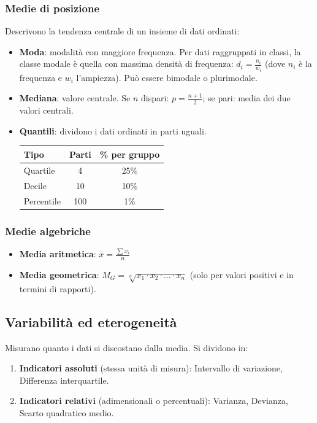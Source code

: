 \documentclass[a4paper,11pt]{article}
\begin{document}
\subsubsection{Medie di posizione}
Descrivono la tendenza centrale di un insieme di dati ordinati:
\begin{itemize}
    \item \textbf{Moda}: modalità con maggiore frequenza. Per dati raggruppati in classi, la classe modale è quella con massima densità di frequenza: $d_i = \frac{n_i}{w_i}$ (dove $n_i$ è la frequenza e $w_i$ l'ampiezza). Può essere bimodale o plurimodale.
    \item \textbf{Mediana}: valore centrale. Se $n$ dispari: $p = \frac{n+1}{2}$; se pari: media dei due valori centrali.
    \item \textbf{Quantili}: dividono i dati ordinati in parti uguali.
    \begin{center}
    \begin{tabular}{lcc}
        \toprule
        \textbf{Tipo} & \textbf{Parti} & \textbf{\% per gruppo} \\
        \midrule
        Quartile & 4 & 25\% \\
        Decile & 10 & 10\% \\
        Percentile & 100 & 1\% \\
        \bottomrule
    \end{tabular}
    \end{center}
\end{itemize}

\subsubsection{Medie algebriche}
\begin{itemize}
    \item \textbf{Media aritmetica}: $\bar{x} = \frac{\sum x_i}{n}$
    \item \textbf{Media geometrica}: $M_G = \sqrt[n]{x_1 \cdot x_2 \cdot \dots \cdot x_n}$ (solo per valori positivi e in termini di rapporti).
\end{itemize}

\subsection{Variabilità ed eterogeneità}
Misurano quanto i dati si discostano dalla media. Si dividono in:
\begin{enumerate}
    \item \textbf{Indicatori assoluti} (stessa unità di misura): Intervallo di variazione, Differenza interquartile.
    \item \textbf{Indicatori relativi} (adimensionali o percentuali): Varianza, Devianza, Scarto quadratico medio.
\end{enumerate}
\end{document}
